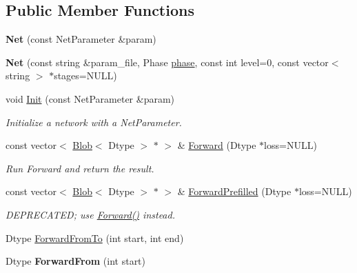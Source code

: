 \subsection*{Public Member Functions}
\begin{DoxyCompactItemize}
\item 
{\bfseries Net} (const Net\+Parameter \&param)\hypertarget{classcaffe_1_1Net_a5a5655a49c702c6c4a2f5bd7bf7adf12}{}\label{classcaffe_1_1Net_a5a5655a49c702c6c4a2f5bd7bf7adf12}

\item 
{\bfseries Net} (const string \&param\+\_\+file, Phase \hyperlink{classcaffe_1_1Net_a73a53387587ebcab5c3317343121f07b}{phase}, const int level=0, const vector$<$ string $>$ $\ast$stages=N\+U\+LL)\hypertarget{classcaffe_1_1Net_ac42c11d2fa9546421d6c5cd7f83330b3}{}\label{classcaffe_1_1Net_ac42c11d2fa9546421d6c5cd7f83330b3}

\item 
void \hyperlink{classcaffe_1_1Net_ae9fcfaabc89165d6c0cb4b14b4c6b584}{Init} (const Net\+Parameter \&param)\hypertarget{classcaffe_1_1Net_ae9fcfaabc89165d6c0cb4b14b4c6b584}{}\label{classcaffe_1_1Net_ae9fcfaabc89165d6c0cb4b14b4c6b584}

\begin{DoxyCompactList}\small\item\em Initialize a network with a Net\+Parameter. \end{DoxyCompactList}\item 
const vector$<$ \hyperlink{classcaffe_1_1Blob}{Blob}$<$ Dtype $>$ $\ast$ $>$ \& \hyperlink{classcaffe_1_1Net_a6f6cf9d40637f7576828d856bb1b1826}{Forward} (Dtype $\ast$loss=N\+U\+LL)\hypertarget{classcaffe_1_1Net_a6f6cf9d40637f7576828d856bb1b1826}{}\label{classcaffe_1_1Net_a6f6cf9d40637f7576828d856bb1b1826}

\begin{DoxyCompactList}\small\item\em Run Forward and return the result. \end{DoxyCompactList}\item 
const vector$<$ \hyperlink{classcaffe_1_1Blob}{Blob}$<$ Dtype $>$ $\ast$ $>$ \& \hyperlink{classcaffe_1_1Net_a12f8c6cf9f453cdbc9fa8149986303c6}{Forward\+Prefilled} (Dtype $\ast$loss=N\+U\+LL)\hypertarget{classcaffe_1_1Net_a12f8c6cf9f453cdbc9fa8149986303c6}{}\label{classcaffe_1_1Net_a12f8c6cf9f453cdbc9fa8149986303c6}

\begin{DoxyCompactList}\small\item\em D\+E\+P\+R\+E\+C\+A\+T\+ED; use \hyperlink{classcaffe_1_1Net_a6f6cf9d40637f7576828d856bb1b1826}{Forward()} instead. \end{DoxyCompactList}\item 
Dtype \hyperlink{classcaffe_1_1Net_ae5354c03371d4cb7b18988561790e676}{Forward\+From\+To} (int start, int end)
\item 
Dtype {\bfseries Forward\+From} (int start)\hypertarget{classcaffe_1_1Net_a7da4abdebcea6a65ca61ef6afb61665f}{}\label{classcaffe_1_1Net_a7da4abdebcea6a65ca61ef6afb61665f}


\end{DoxyCompactItemize}
